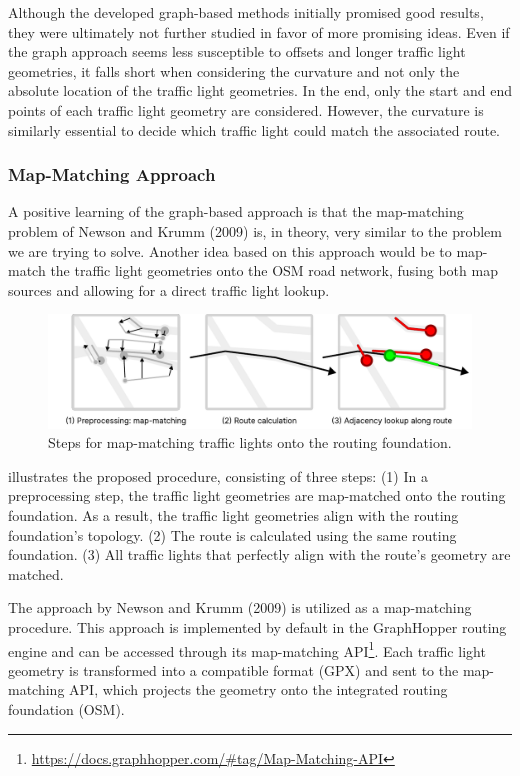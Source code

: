 Although the developed graph-based methods initially promised good results, they were ultimately not further studied in favor of more promising ideas. Even if the graph approach seems less susceptible to offsets and longer traffic light geometries, it falls short when considering the curvature and not only the absolute location of the traffic light geometries. In the end, only the start and end points of each traffic light geometry are considered. However, the curvature is similarly essential to decide which traffic light could match the associated route.

\subsubsection{Map-Matching Approach}

A positive learning of the graph-based approach is that the map-matching problem of Newson and Krumm (2009) \cite{newson_hidden_2009} is, in theory, very similar to the problem we are trying to solve. Another idea based on this approach would be to map-match the traffic light geometries onto the OSM road network, fusing both map sources and allowing for a direct traffic light lookup.

\begin{figure}[t]
\centering
\includegraphics[width=\linewidth]{images/sg-selection-map-matching-approach.pdf}
\caption{Steps for map-matching traffic lights onto the routing foundation.}
\label{fig:sg-selection-map-matching-approach}
\end{figure}

 illustrates the proposed procedure, consisting of three steps: (1) In a preprocessing step, the traffic light geometries are map-matched onto the routing foundation. As a result, the traffic light geometries align with the routing foundation's topology. (2) The route is calculated using the same routing foundation. (3) All traffic lights that perfectly align with the route's geometry are matched.

The approach by Newson and Krumm (2009) \cite{newson_hidden_2009} is utilized as a map-matching procedure. This approach is implemented by default in the GraphHopper routing engine and can be accessed through its map-matching API\footnote{\url{https://docs.graphhopper.com/\#tag/Map-Matching-API}}. Each traffic light geometry is transformed into a compatible format (GPX) and sent to the map-matching API, which projects the geometry onto the integrated routing foundation (OSM).

